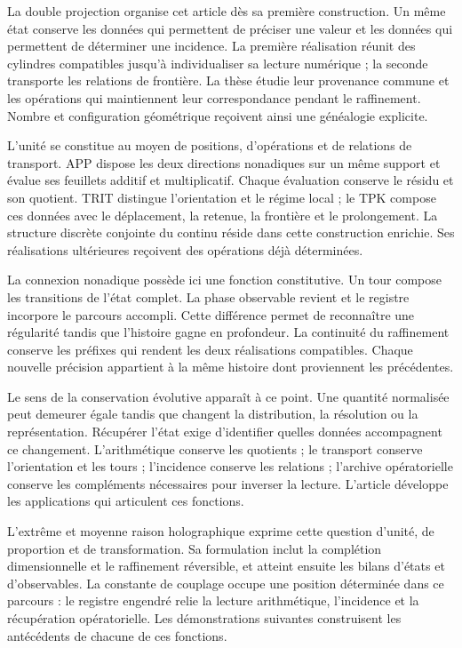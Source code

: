 
La double projection organise cet article dès sa première construction. Un
même état conserve les données qui permettent de préciser une valeur et les données
qui permettent de déterminer une incidence. La première réalisation réunit
des cylindres compatibles jusqu’à individualiser sa lecture numérique ; la seconde
transporte les relations de frontière. La thèse étudie leur provenance
commune et les opérations qui maintiennent leur correspondance pendant le
raffinement. Nombre et configuration géométrique reçoivent ainsi une généalogie
explicite.

L’unité se constitue au moyen de positions, d’opérations et de relations de
transport. APP dispose les deux directions nonadiques sur un même
support et évalue ses feuillets additif et multiplicatif. Chaque évaluation
conserve le résidu et son quotient. TRIT distingue l’orientation et le
régime local ; le TPK compose ces données avec le déplacement, la retenue,
la frontière et le prolongement. La structure discrète conjointe du
continu réside dans cette construction enrichie. Ses réalisations
ultérieures reçoivent des opérations déjà déterminées.

La connexion nonadique possède ici une fonction constitutive. Un tour compose les transitions de l'état complet. La phase observable revient et le registre incorpore le parcours accompli. Cette différence permet de reconnaître une régularité tandis que l'histoire gagne en profondeur. La continuité du raffinement conserve les préfixes qui rendent les deux réalisations compatibles. Chaque nouvelle précision appartient à la même histoire dont proviennent les précédentes.

Le sens de la conservation évolutive apparaît à ce point. Une quantité
normalisée peut demeurer égale tandis que changent la distribution, la
résolution ou la représentation. Récupérer l’état exige d’identifier quelles
données accompagnent ce changement. L’arithmétique conserve les quotients ; le transport
conserve l’orientation et les tours ; l’incidence conserve les relations ;
l’archive opératorielle conserve les compléments nécessaires pour inverser la
lecture. L’article développe les applications qui articulent ces fonctions.

L'extrême et moyenne raison holographique exprime cette question d'unité, de proportion et de transformation. Sa formulation inclut la complétion dimensionnelle et le raffinement réversible, et atteint ensuite les bilans d'états et d'observables. La constante de couplage occupe une position déterminée dans ce parcours : le registre engendré relie la lecture arithmétique, l'incidence et la récupération opératorielle. Les démonstrations suivantes construisent les antécédents de chacune de ces fonctions.

